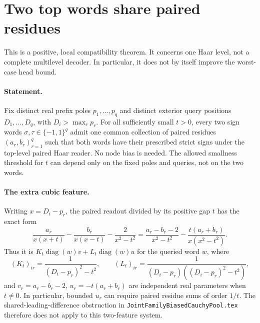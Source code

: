 \section{Two top words share paired residues}

This is a positive, local compatibility theorem.  It concerns one Haar
level, not a complete multilevel decoder.  In particular, it does not by
itself improve the worst-case head bound.

\paragraph{Statement.}
Fix distinct real prefix poles $p_1,\ldots,p_q$ and distinct exterior
query positions $D_1,\ldots,D_q$, with $D_i>\max_r p_r$.
For all sufficiently small $t>0$, every two sign words
$\sigma,\tau\in\{-1,1\}^q$ admit one common collection of paired
residues $(a_r,b_r)_{r=1}^q$ such that both words have their prescribed
strict signs under the top-level paired Haar reader.  No node bias is
needed.  The allowed smallness threshold for $t$ can depend only on the
fixed poles and queries, not on the two words.

\paragraph{The extra cubic feature.}
Writing $x=D_i-p_r$, the paired readout divided by its positive gap $t$
has the exact form
\[
 \frac{a_r}{x(x+t)}-\frac{b_r}{x(x-t)}-\frac{2}{x^2-t^2}
 =\frac{a_r-b_r-2}{x^2-t^2}
  -\frac{t(a_r+b_r)}{x(x^2-t^2)}.
\]
Thus it is $K_t\operatorname{diag}(w)v+
L_t\operatorname{diag}(w)u$ for the queried word $w$, where
\[
 (K_t)_{ir}=\frac1{(D_i-p_r)^2-t^2},\qquad
 (L_t)_{ir}=\frac1{(D_i-p_r)((D_i-p_r)^2-t^2)},
\]
and $v_r=a_r-b_r-2$, $u_r=-t(a_r+b_r)$ are independent real
parameters when $t\neq0$.  In particular, bounded $u_r$ can require
paired residue sums of order $1/t$.  The shared-leading-difference
obstruction in \texttt{JointFamilyBiasedCauchyPool.tex} therefore does
not apply to this two-feature system.

